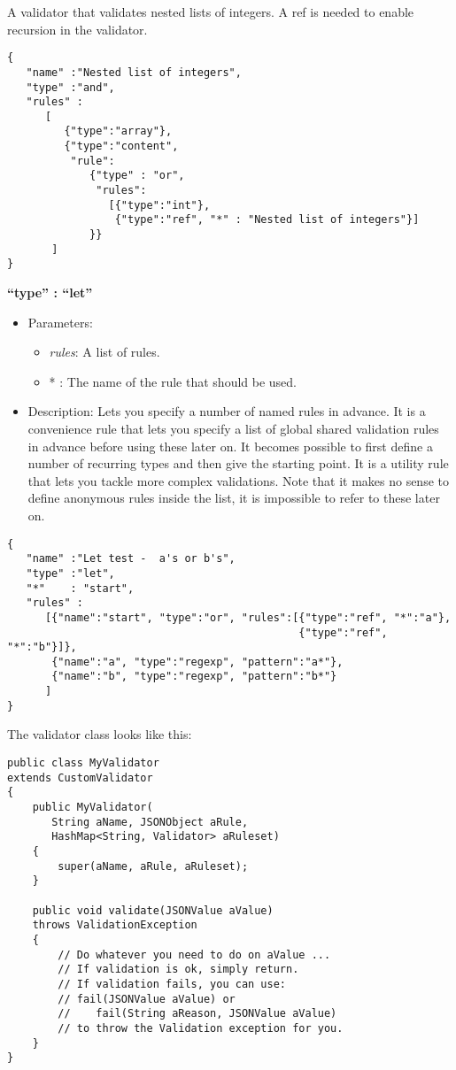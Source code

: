 \documentclass[a4paper]{article}
\newcommand{\ruledef}[3]{
\medskip
\textbf{#1}

\begin{itemize}
\setlength{\itemsep}{1pt}
\setlength{\parskip}{0pt}
\setlength{\parsep}{0pt}
   \item Parameters: #2
   \item Description: #3
\end{itemize}
}
\newcommand{\rulename}[1]{\textbf{``type'' : ``#1''}}
\newcommand{\param}[1]{\textsl{#1}:}
\begin{document}
A validator that validates nested lists of integers. A ref is needed to enable recursion in the validator.

\begin{lstlisting}
{
   "name" :"Nested list of integers",
   "type" :"and",
   "rules" :
      [ 
         {"type":"array"},
         {"type":"content",
          "rule":
             {"type" : "or",
              "rules": 
                [{"type":"int"}, 
                 {"type":"ref", "*" : "Nested list of integers"}]
             }}
       ]
}
\end{lstlisting}

\ruledef{\rulename{let}}{\begin{itemize} \item \param{rules} A list of rules.\item * : The name of the rule that should be used.\end{itemize}}{Lets you specify a number of named rules in advance. It is a convenience rule that lets you specify a list of global shared validation rules in advance before using these later on. It becomes possible to first define a number of recurring types and then give the starting point. It is a utility rule that lets you tackle more complex validations. Note that it  makes no sense to define anonymous rules inside the list, it is impossible to refer to these later on.}

\begin{lstlisting}
{
   "name" :"Let test -  a's or b's",
   "type" :"let",
   "*"    : "start",
   "rules" : 
      [{"name":"start", "type":"or", "rules":[{"type":"ref", "*":"a"}, 
                                              {"type":"ref", "*":"b"}]},
       {"name":"a", "type":"regexp", "pattern":"a*"},
       {"name":"b", "type":"regexp", "pattern":"b*"}
      ]
}
\end{lstlisting}

The validator class looks like this:

\begin{lstlisting}
public class MyValidator
extends CustomValidator
{
    public MyValidator(
       String aName, JSONObject aRule,
       HashMap<String, Validator> aRuleset)
    {
        super(aName, aRule, aRuleset);
    }

    public void validate(JSONValue aValue) 
    throws ValidationException
    {
        // Do whatever you need to do on aValue ...
        // If validation is ok, simply return.
        // If validation fails, you can use:
        // fail(JSONValue aValue) or 
        //    fail(String aReason, JSONValue aValue)
        // to throw the Validation exception for you.
    }
}
\end{lstlisting}
\end{document}
